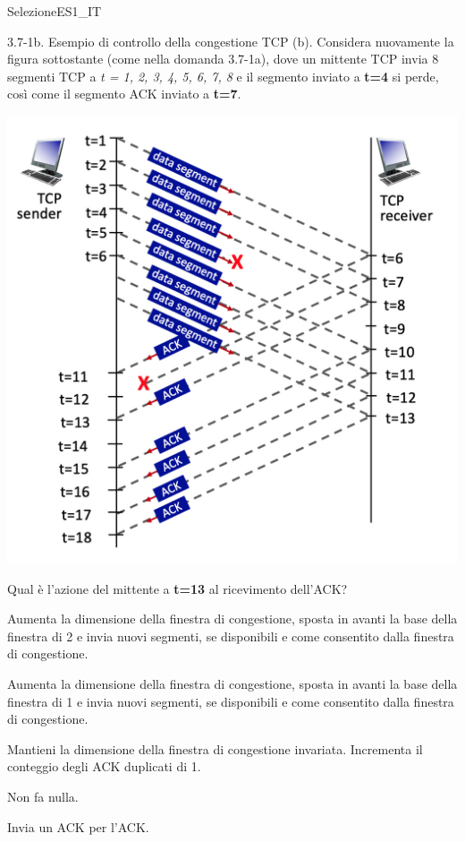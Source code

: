 \documentclass[a4paper]{article}
\begin{document}
\begin{quiz}{SelezioneES1\_IT}
\begin{multi}[points=1,shuffle]{3.7-1b. Esempio di controllo della congestione TCP (b).}
Considera nuovamente la figura sottostante (come nella domanda 3.7-1a), dove un mittente TCP invia 8 segmenti TCP a \emph{t = 1, 2, 3, 4, 5, 6, 7, 8} e il segmento inviato a \textbf{t=4} si perde, così come il segmento ACK inviato a \textbf{t=7}.

\begin{center}
	\includegraphics[width=\linewidth]{figs/tcp_seq_ack_1.jpg}
\end{center}

Qual è l'azione del mittente a \textbf{t=13} al ricevimento dell'ACK?
\item* Aumenta la dimensione della finestra di congestione, sposta in avanti la base della finestra di 2 e invia nuovi segmenti, se disponibili e come consentito dalla finestra di congestione.
\item Aumenta la dimensione della finestra di congestione, sposta in avanti la base della finestra di 1 e invia nuovi segmenti, se disponibili e come consentito dalla finestra di congestione.
\item Mantieni la dimensione della finestra di congestione invariata. Incrementa il conteggio degli ACK duplicati di 1.
\item Non fa nulla.
\item Invia un ACK per l'ACK.
\end{multi}


\end{quiz}
\end{document}
